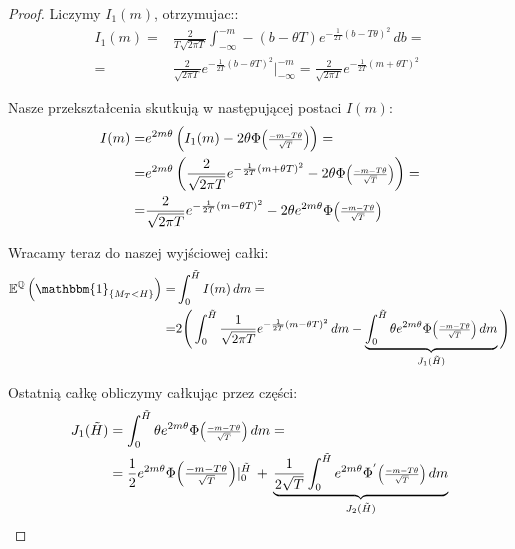 \documentclass[11pt]{report}
\newcommand*{\Scale}[2][4]{\scalebox{#1}{$#2$}}%
\begin{document}
\begin{proof}
Liczymy $I_1(m)$, otrzymujac::
\begin{equation*}
\begin{split}
 I_1(m) = & \frac{2}{T\sqrt{2\pi T}} \int_{-\infty}^{-m}-(b-\theta T)e^{-\frac{1}{2T}(b - T\theta )^2}\,db = \\ = & \frac{2}{\sqrt{2\pi T}} e^{-\frac{1}{2T}(b-\theta T)^2} \bigg|_{-\infty}^{-m} = \frac{2}{\sqrt{2\pi T}} e^{-\frac{1}{2T}(m+\theta T)^2} 
\end{split}
\end{equation*}

Nasze przekształcenia skutkują w następującej postaci $I(m)$:
\begin{multline*}
\begin{split}
 I(m) = & e^{2m\theta}\left( I_1(m)-2\theta \Phi \Scale[0.8]{\left(\frac{-m-T\theta}{\sqrt{T}}\right)} \right) = \\ = &  e^{2m\theta}\left(\frac{2}{\sqrt{2\pi T}} e^{-\frac{1}{2T}(m+\theta T)^2} - 2\theta \Phi \Scale[0.8]{\left(\frac{-m-T\theta}{\sqrt{T}}\right)}\right) = \\ = & \frac{2}{\sqrt{2\pi T}} e^{-\frac{1}{2T}(m-\theta T)^2} - 2\theta e^{2m\theta} \Phi \Scale[0.8]{\left(\frac{-m-T\theta}{\sqrt{T}}\right)}
\end{split} 
 \end{multline*}

\vspace{0,2cm}
Wracamy teraz do naszej wyjściowej całki:
\begin{equation*}
\begin{split}
\mathbb{E}^{\mathbb{Q}}\left( \mathbbm{1}_{ \{ M_T<H \} } \right) = & \int_{0}^{\tilde{H}} I(m) \,dm = \\ = & 2\Bigg( \int_{0}^{\tilde{H}}\frac{1}{\sqrt{2\pi T}} e^{-\frac{1}{2T}(m-\theta T)^2}\,dm - \underbrace{ \int_{0}^{\tilde{H}}\theta e^{2m\theta} \Phi \Scale[0.8]{\left(\frac{-m-T\theta}{\sqrt{T}}\right)}\,dm 
}_{J_1(\tilde{H})} \Bigg)  
\end{split}
\end{equation*}

\vspace{0,5cm}

Ostatnią całkę obliczymy całkując przez części:
\begin{multline*}
\begin{split}
J_1(\tilde{H}) & = \int_{0}^{\tilde{H}} \theta  e^{2m\theta} \Phi \Scale[0.8]{\left(\frac{-m-T\theta}{\sqrt{T}}\right)} \,dm = \\ & = \frac{1}{2}e^{2m\theta} \Phi \Scale[1.0]{\left(\frac{-m-T\theta}{\sqrt{T}}\right)} |_{0}^{\tilde{H}} \, + \, \underbrace{\frac{1}{2\sqrt{T}} \int_{0}^{\tilde{H}}e^{2m\theta}\Phi^{'} \Scale[0.8]{\left(\frac{-m-T\theta}{\sqrt{T}}\right)}\,dm }_{J_2(\tilde{H})}
\end{split}
\end{multline*}


\end{proof}
\end{document}
